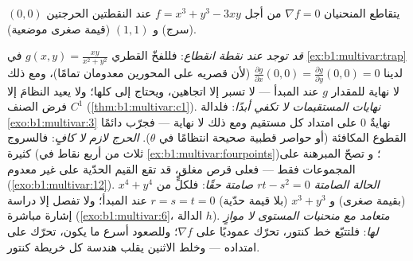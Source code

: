 \begin{omfigure}

{\small يتقاطع المنحنيان $\nabla f = 0$ من أجل $f = x^3 + y^3 - 3xy$
عند النقطتين الحرجتين $(0,0)$ (سرج) و $(1,1)$
(قيمة صغرى موضعية).}
\end{omfigure}

\begin{remark}
\label{rem:b1:multivar:pitfalls}
\emph{قد توجد  عند نقطة
انقطاع}: فللفخّ القطري $g(x,y) = \frac{xy}{x^2+y^2}$ في
\cref{ex:b1:multivar:trap} لدينا $\frac{\partial g}{\partial
x}(0,0) = \frac{\partial g}{\partial y}(0,0) = 0$ (لأن قصريه على
المحورين معدومان تمامًا)، ومع ذلك لا نهاية للمقدار $g$ عند
المبدأ ---  لا تسبر إلا اتجاهين، ويحتاج 
إلى كلها؛ ولا يعيد النظامَ إلا فرض الصنف $C^1$
(\cref{thm:b1:multivar:c1}).
\emph{نهايات المستقيمات لا تكفي أبدًا}: فلدالة \cref{exo:b1:multivar:3}
نهايةٌ $0$ على امتداد كل مستقيم ومع ذلك لا نهاية ---
فجرّب دائمًا القطوع المكافئة (أو حواصر قطبية صحيحة انتظامًا في
$\theta$).
\emph{الحرج لازم لا كافٍ}: فالسروج كثيرة
(ثلاث من أربع نقاط في \cref{ex:b1:multivar:fourpoints})؛ و
تصحّ المبرهنة على المجموعات \emph{} فقط --- فعلى قرص مغلق،
قد تقع القيم الحدّية على   غير معدوم
(\cref{exo:b1:multivar:12}).
\emph{الحالة الصامتة $rt - s^2 = 0$ صامتة حقًا}: فلكلٍّ من $x^4
+ y^4$ (بقيمة صغرى) و $x^3 + y^3$ (بلا قيمة حدّية) $r = s = t
= 0$ عند المبدأ؛ ولا تفصل إلا دراسة إشارة مباشرة
(\cref{exo:b1:multivar:6}، الدالة $h$).
\emph{ متعامد مع منحنيات المستوى لا موازٍ
لها}: فلتتبّع خط كنتور، تحرّك عموديًا على $\nabla
f$؛ وللصعود أسرع ما يكون، تحرّك على امتداده --- وخلط الاثنين يقلب
هندسة كل خريطة كنتور.
\end{remark}

